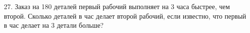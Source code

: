 27. Заказ на 180 деталей первый рабочий выполняет на 3 часа быстрее, чем второй. Сколько деталей в час делает второй рабочий, если известно, что первый в час делает на 3 детали больше?\\
